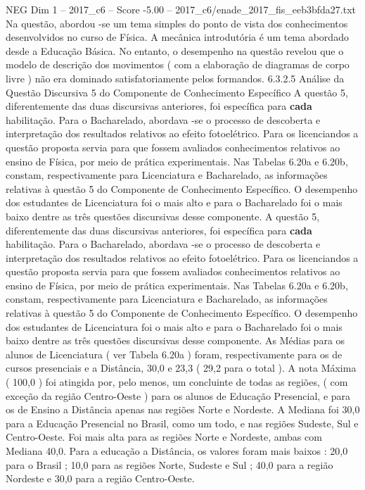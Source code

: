 \begin{textsample}{NEG Dim 1 – 2017\_c6 – Score -5.00 – 2017\_c6/enade\_2017\_fis\_eeb3bfda27.txt}
Na questão, abordou -se um tema simples do ponto de vista dos conhecimentos desenvolvidos no curso de Física.
A mecânica introdutória é um tema abordado desde a Educação Básica.
No entanto, o desempenho na questão revelou que o modelo de descrição dos movimentos ( com a elaboração de diagramas de corpo livre ) não era dominado satisfatoriamente pelos formandos. 6.3.2.5 Análise da Questão Discursiva 5 do Componente de Conhecimento Específico A questão 5, diferentemente das duas discursivas anteriores, foi específica para \textbf{cada} habilitação.
Para o Bacharelado, abordava -se o processo de descoberta e interpretação dos resultados relativos ao efeito fotoelétrico.
Para os licenciandos a questão proposta servia para que fossem avaliados conhecimentos relativos ao ensino de Física, por meio de prática experimentais.
Nas Tabelas 6.20a e 6.20b, constam, respectivamente para Licenciatura e Bacharelado, as informações relativas à questão 5 do Componente de Conhecimento Específico.
O desempenho dos estudantes de Licenciatura foi o mais alto e para o Bacharelado foi o mais baixo dentre as três questões discursivas desse componente.
A questão 5, diferentemente das duas discursivas anteriores, foi específica para \textbf{cada} habilitação.
Para o Bacharelado, abordava -se o processo de descoberta e interpretação dos resultados relativos ao efeito fotoelétrico.
Para os licenciandos a questão proposta servia para que fossem avaliados conhecimentos relativos ao ensino de Física, por meio de prática experimentais.
Nas Tabelas 6.20a e 6.20b, constam, respectivamente para Licenciatura e Bacharelado, as informações relativas à questão 5 do Componente de Conhecimento Específico.
O desempenho dos estudantes de Licenciatura foi o mais alto e para o Bacharelado foi o mais baixo dentre as três questões discursivas desse componente.
As Médias para os alunos de Licenciatura ( ver Tabela 6.20a ) foram, respectivamente para os de cursos presenciais e a Distância, 30,0 e 23,3 ( 29,2 para o total ).
A nota Máxima ( 100,0 ) foi atingida por, pelo menos, um concluinte de todas as regiões, ( com exceção da região Centro-Oeste ) para os alunos de Educação Presencial, e para os de Ensino a Distância apenas nas regiões Norte e Nordeste.
A Mediana foi 30,0 para a Educação Presencial no Brasil, como um todo, e nas regiões Sudeste, Sul e Centro-Oeste.
Foi mais alta para as regiões Norte e Nordeste, ambas com Mediana 40,0.
Para a educação a Distância, os valores foram mais baixos : 20,0 para o Brasil ; 10,0 para as regiões Norte, Sudeste e Sul ; 40,0 para a região Nordeste e 30,0 para a região Centro-Oeste.

\end{textsample}
